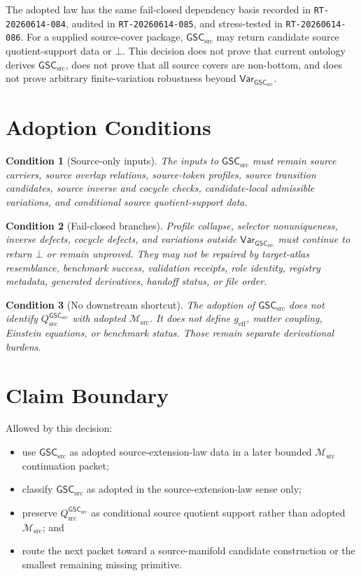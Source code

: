 \documentclass[11pt]{article}
\newcommand{\Msrc}{\mathcal{M}_{\mathrm{src}}}
\newcommand{\geff}{g_{\mathrm{eff}}}
\newcommand{\GSC}{\mathsf{GSC}_{\mathrm{src}}}
\newcommand{\Vargsc}{\mathsf{Var}_{\GSC}}
\newcommand{\Qsrc}{Q_{\mathrm{src}}^{\GSC}}
\newcommand{\Bot}{\bot}
\newtheorem{condition}{Condition}
\begin{document}
The adopted law has the same fail-closed dependency basis recorded in
\texttt{RT-20260614-084}, audited in \texttt{RT-20260614-085}, and
stress-tested in \texttt{RT-20260614-086}. For a supplied source-cover package,
\(\GSC\) may return candidate source quotient-support data or \(\Bot\). This
decision does not prove that current ontology derives \(\GSC\), does not prove
that all source covers are non-bottom, and does not prove arbitrary
finite-variation robustness beyond \(\Vargsc\).

\section{Adoption Conditions}

\begin{condition}[Source-only inputs]
The inputs to \(\GSC\) must remain source carriers, source overlap relations,
source-token profiles, source transition candidates, source inverse and
cocycle checks, candidate-local admissible variations, and conditional source
quotient-support data.
\end{condition}

\begin{condition}[Fail-closed branches]
Profile collapse, selector nonuniqueness, inverse defects, cocycle defects,
and variations outside \(\Vargsc\) must continue to return \(\Bot\) or remain
unproved. They may not be repaired by target-atlas resemblance, benchmark
success, validation receipts, role identity, registry metadata, generated
derivatives, handoff status, or file order.
\end{condition}

\begin{condition}[No downstream shortcut]
The adoption of \(\GSC\) does not identify \(\Qsrc\) with adopted \(\Msrc\).
It does not define \(\geff\), matter coupling, Einstein equations, or
benchmark status. Those remain separate derivational burdens.
\end{condition}

\section{Claim Boundary}

Allowed by this decision:
\begin{itemize}
  \item use \(\GSC\) as adopted source-extension-law data in a later bounded
  \(\Msrc\) continuation packet;
  \item classify \(\GSC\) as adopted in the source-extension-law sense only;
  \item preserve \(\Qsrc\) as conditional source quotient support rather than
  adopted \(\Msrc\); and
  \item route the next packet toward a source-manifold candidate construction
  or the smallest remaining missing primitive.
\end{itemize}
\end{document}
